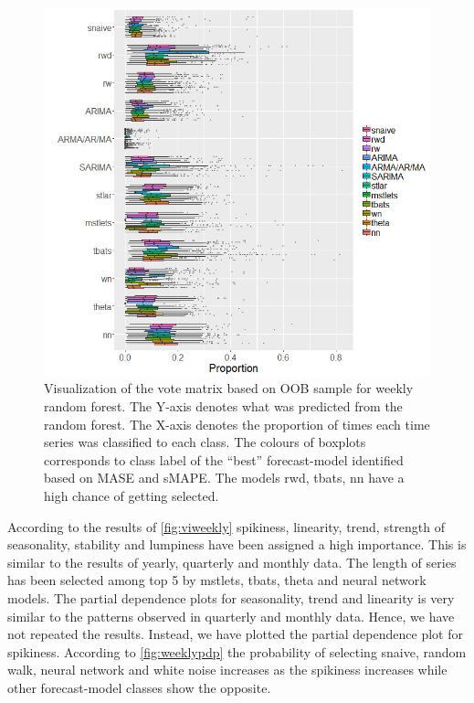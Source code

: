 \documentclass[11pt,a4paper,]{article}
\begin{document}
\begin{figure}
\centering
\includegraphics{figures/oobweekly-1.png}
\caption{\label{fig:oobweekly}Visualization of the vote matrix based on OOB
sample for weekly random forest. The Y-axis denotes what was predicted
from the random forest. The X-axis denotes the proportion of times each
time series was classified to each class. The colours of boxplots
corresponds to class label of the ``best'' forecast-model identified
based on MASE and sMAPE. The models rwd, tbats, nn have a high chance of
getting selected.}
\end{figure}

According to the results of \autoref{fig:viweekly} spikiness, linearity,
trend, strength of seasonality, stability and lumpiness have been
assigned a high importance. This is similar to the results of yearly,
quarterly and monthly data. The length of series has been selected among
top 5 by mstlets, tbats, theta and neural network models. The partial
dependence plots for seasonality, trend and linearity is very similar to
the patterns observed in quarterly and monthly data. Hence, we have not
repeated the results. Instead, we have plotted the partial dependence
plot for spikiness. According to \autoref{fig:weeklypdp} the probability
of selecting snaive, random walk, neural network and white noise
increases as the spikiness increases while other forecast-model classes
show the opposite.
\end{document}
